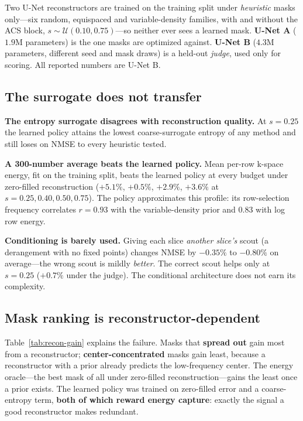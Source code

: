 \documentclass{article}
\begin{document}
Two U-Net reconstructors are trained on the training split under \emph{heuristic} masks only---six random, equispaced and variable-density families, with and without the ACS block, $s \sim \mathcal{U}(0.10, 0.75)$---so neither ever sees a learned mask. \textbf{U-Net A} ($1.9$M parameters) is the one masks are optimized against. \textbf{U-Net B} ($4.3$M parameters, different seed and mask draws) is a held-out \emph{judge}, used only for scoring. All reported numbers are U-Net B.

\subsection{The surrogate does not transfer}
\textbf{The entropy surrogate disagrees with reconstruction quality.} At $s = 0.25$ the learned policy attains the lowest coarse-surrogate entropy of any method and still loses on NMSE to every heuristic tested.

\textbf{A 300-number average beats the learned policy.} Mean per-row k-space energy, fit on the training split, beats the learned policy at every budget under zero-filled reconstruction ($+5.1\%$, $+0.5\%$, $+2.9\%$, $+3.6\%$ at $s = 0.25, 0.40, 0.50, 0.75$). The policy approximates this profile: its row-selection frequency correlates $r = 0.93$ with the variable-density prior and $0.83$ with log row energy.

\textbf{Conditioning is barely used.} Giving each slice \emph{another slice's} scout (a derangement with no fixed points) changes NMSE by $-0.35\%$ to $-0.80\%$ on average---the wrong scout is mildly \emph{better}. The correct scout helps only at $s = 0.25$ ($+0.7\%$ under the judge). The conditional architecture does not earn its complexity.

\subsection{Mask ranking is reconstructor-dependent}
Table~\ref{tab:recon-gain} explains the failure. Masks that \textbf{spread out} gain most from a reconstructor; \textbf{center-concentrated} masks gain least, because a reconstructor with a prior already predicts the low-frequency center. The energy oracle---the best mask of all under zero-filled reconstruction---gains the least once a prior exists. The learned policy was trained on zero-filled error and a coarse-entropy term, \textbf{both of which reward energy capture}: exactly the signal a good reconstructor makes redundant.
\end{document}
